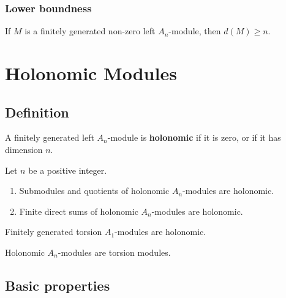 \documentclass[12pt, oneside]{book}
\begin{document}
\subsection{Lower boundness}
\begin{theorem}
    If $M$ is a finitely generated non-zero left $A_n$-module, then $d(M) \geq n$.
\end{theorem}





\chapter{Holonomic Modules} %
\section{Definition}
\begin{definition}
    A finitely generated left $A_n$-module is \textbf{holonomic} if it is zero, or if it has dimension $n$.
\end{definition}

\begin{proposition}
    Let $n$ be a positive integer.
    \begin{enumerate}
        \item
              Submodules and quotients of holonomic $A_n$-modules are holonomic.
        \item
              Finite direct sums of holonomic $A_n$-modules are holonomic.
    \end{enumerate}
\end{proposition}









\begin{corollary}
    Finitely generated torsion $A_1$-modules are holonomic.
\end{corollary}





\begin{proposition}
    Holonomic $A_n$-modules are torsion modules.
\end{proposition}


\section{Basic properties}
\end{document}
